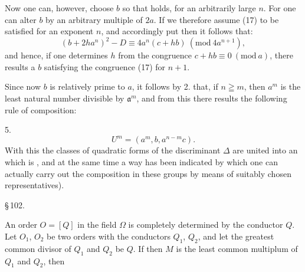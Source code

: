Now one can, however, choose $b$ so that
holds, for an arbitrarily large $n$. For one can alter $b$ by an arbitrary multiple of $2a$. If we therefore assume (17) to be satisfied for an exponent $n$, and accordingly put
then it follows that:
\[
(b + 2ha^n)^2 - D \equiv 4a^n(c+hb) \ (\mathrm{mod}\ 4a^{n+1}),
\]
and hence, if one determines $h$ from the congruence $c + hb \equiv 0 \ (\mathrm{mod}\ a)$, there results a $b$ satisfying the congruence (17) for $n+1$.

Since now $b$ is relatively prime to $a$, it follows by 2. that, if $n \geqq m$, then $a^m$ is the least natural number divisible by $\mathfrak{a}^m$, and from this there results the following rule of composition:

5. 
\[
U^m = (a^m, b, a^{n-m}c).
\]
With this the classes of quadratic forms of the discriminant $\Delta$ are united into an  which is , and at the same time a way has been indicated by which one can actually carry out the composition in these groups by means of suitably chosen representatives\footnotemark[1]).

\begin{center}
\S\,102. 
\end{center}

An order $O = [Q]$ in the field $\Omega$ is completely determined by the conductor $Q$. Let $O_1$, $O_2$ be two orders with the conductors $Q_1$, $Q_2$, and let the greatest common divisor of $Q_1$ and $Q_2$ be $Q$. If then $M$ is the least common multiplum of $Q_1$ and $Q_2$, then

\begingroup
\renewcommand{\thefootnote}{1)}
\endgroup
